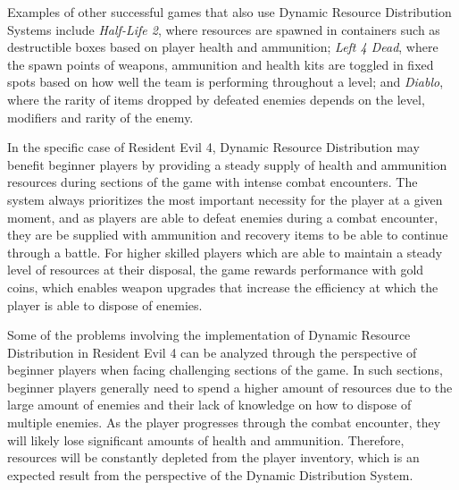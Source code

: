 
Examples of other successful games that also use Dynamic Resource Distribution Systems include \emph{Half-Life 2}, where resources are spawned in containers such as destructible boxes based on player health and ammunition; \emph{Left 4 Dead}, where the spawn points of weapons, ammunition and health kits are toggled in fixed spots based on how well the team is performing throughout a level; and \emph{Diablo}, where the rarity of items dropped by defeated enemies depends on the level, modifiers and rarity of the enemy.

In the specific case of Resident Evil 4, Dynamic Resource Distribution may benefit beginner players by providing a steady supply of health and ammunition resources during sections of the game with intense combat encounters. The system always prioritizes the most important necessity for the player at a given moment, and as players are able to defeat enemies during a combat encounter, they are be supplied with ammunition and recovery items to be able to continue through a battle. For higher skilled players which are able to maintain a steady level of resources at their disposal, the game rewards performance with gold coins, which enables weapon upgrades that increase the efficiency at which the player is able to dispose of enemies. 



Some of the problems involving the implementation of Dynamic Resource Distribution in Resident Evil 4 can be analyzed through the perspective of beginner players when facing challenging sections of the game. In such sections, beginner players generally need to spend a higher amount of resources due to the large amount of enemies and their lack of knowledge on how to dispose of multiple enemies. As the player progresses through the combat encounter, they will likely lose significant amounts of health and ammunition. Therefore, resources will be constantly depleted from the player inventory, which is an expected result from the perspective of the Dynamic Distribution System. 

